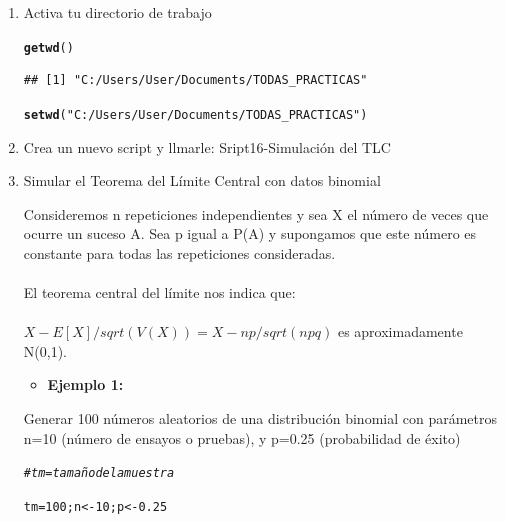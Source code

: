 \documentclass[12pt,letterpaper]{article}\usepackage[]{graphicx}\usepackage[]{color}
\makeatletter
\newcommand{\hlnum}[1]{\textcolor[rgb]{0.686,0.059,0.569}{#1}}%
\newcommand{\hlstr}[1]{\textcolor[rgb]{0.192,0.494,0.8}{#1}}%
\newcommand{\hlcom}[1]{\textcolor[rgb]{0.678,0.584,0.686}{\textit{#1}}}%
\newcommand{\hlstd}[1]{\textcolor[rgb]{0.345,0.345,0.345}{#1}}%
\newcommand{\hlkwb}[1]{\textcolor[rgb]{0.69,0.353,0.396}{#1}}%
\newcommand{\hlkwd}[1]{\textcolor[rgb]{0.737,0.353,0.396}{\textbf{#1}}}%
\newenvironment{kframe}{%
 \def\at@end@of@kframe{}%
 \ifinner\ifhmode%
  \def\at@end@of@kframe{\end{minipage}}%
  \begin{minipage}{\columnwidth}%
 \fi\fi%
 \def\FrameCommand##1{\hskip\@totalleftmargin \hskip-\fboxsep
 \colorbox{shadecolor}{##1}\hskip-\fboxsep
     \hskip-\linewidth \hskip-\@totalleftmargin \hskip\columnwidth}%
 \MakeFramed {\advance\hsize-\width
   \@totalleftmargin\z@ \linewidth\hsize
   \@setminipage}}%
 {\par\unskip\endMakeFramed%
 \at@end@of@kframe}
\newenvironment{knitrout}{}{} %
\makeatother
\begin{document}
\begin{enumerate}
  \item Activa tu directorio de trabajo
\begin{knitrout}
\color{fgcolor}\begin{kframe}
\begin{alltt}
\hlkwd{getwd}\hlstd{()}
\end{alltt}
\begin{verbatim}
## [1] "C:/Users/User/Documents/TODAS_PRACTICAS"
\end{verbatim}
\begin{alltt}
\hlkwd{setwd}\hlstd{(}\hlstr{"C:/Users/User/Documents/TODAS_PRACTICAS"}\hlstd{)}
\end{alltt}
\end{kframe}
\end{knitrout}

\item Crea un nuevo script y llmarle: Sript16-Simulaci\'on del TLC

\item Simular el Teorema del L\'imite Central con datos binomial

Consideremos n repeticiones independientes y sea X el n\'umero de veces que ocurre un suceso A. Sea p igual a P(A) y supongamos que este número es constante para todas las repeticiones consideradas.\\

\\ El teorema central del límite nos indica que:\\
\\ $X-E[X]/sqrt(V(X))=X-np/sqrt(npq)$ es aproximadamente N(0,1).\\

\begin{itemize}
  \item \textbf{Ejemplo 1:}
\end{itemize}
Generar 100 números aleatorios de una distribuci\'on binomial con parámetros n=10 (n\'umero de ensayos o pruebas), y p=0.25 (probabilidad de \'exito)
\begin{knitrout}
\color{fgcolor}\begin{kframe}
\begin{alltt}
\hlcom{# tm= tamaño de la muestra}

\hlstd{tm}\hlkwb{=}\hlnum{100}\hlstd{; n} \hlkwb{<-} \hlnum{10}\hlstd{; p} \hlkwb{<-} \hlnum{0.25}


\end{alltt}
\end{kframe}
\end{knitrout}
\end{enumerate}
\end{document}
